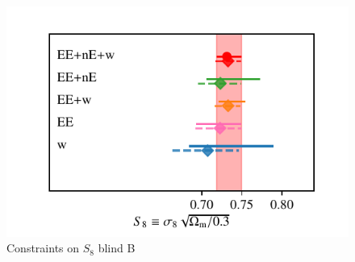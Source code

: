 \begin{figure}
	\begin{center}
		\includegraphics[width=\columnwidth]{Parameter_Plots/S8_comparison_blindB}
		\caption{Constraints on $S_{8}$ blind B}
		\label{fig:S8comp}
	\end{center}
\end{figure}

